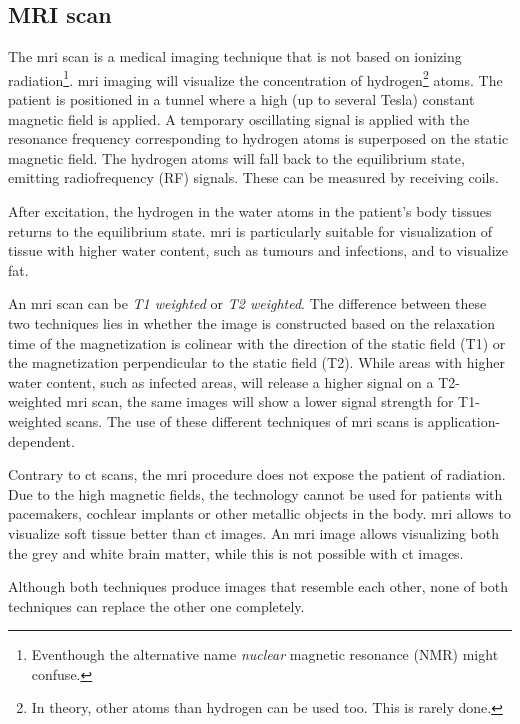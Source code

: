 \subsection{MRI scan}
The \acrfull{mri} scan is a medical imaging technique that is not based on ionizing radiation\footnote{Eventhough the alternative name \textit{nuclear} magnetic resonance (NMR) might confuse.}.
\acrshort{mri} imaging will visualize the concentration of hydrogen\footnote{In theory, other atoms than hydrogen can be used too. This is rarely done.} atoms.
The patient is positioned in a tunnel where a high (up to several Tesla) constant magnetic field is applied. A temporary oscillating signal is applied with the resonance frequency corresponding to hydrogen atoms is superposed on the static magnetic field.
The hydrogen atoms will fall back to the equilibrium state, emitting radiofrequency (RF) signals. These can be measured by receiving coils.

After excitation, the hydrogen in the water atoms in the patient's body tissues returns to the equilibrium state. \acrlong{mri} is particularly suitable for visualization of tissue with higher water content, such as tumours and infections, and to visualize fat.

An \acrshort{mri} scan can be \textit{T1 weighted} or \textit{T2 weighted}. 
The difference between these two techniques lies in whether the image is constructed based on the relaxation time of the magnetization is colinear with the direction of the static field (T1) or the magnetization perpendicular to the static field (T2).
While areas with higher water content, such as infected areas, will release a higher signal on a T2-weighted \acrshort{mri} scan, the same images will show a lower signal strength for T1-weighted scans.
The use of these different techniques of \acrshort{mri} scans is application-dependent.

Contrary to \acrfull{ct} scans, the \acrlong{mri} procedure does not expose the patient of radiation. Due to the high magnetic fields, the technology cannot be used for patients with pacemakers, cochlear implants or other metallic objects in the body.
\acrshort{mri} allows to visualize soft tissue better than \acrshort{ct} images. An \acrshort{mri} image allows visualizing both the grey and white brain matter, while this is not possible with \acrshort{ct} images.


Although both techniques produce images that resemble each other, none of both techniques can replace the other one completely.